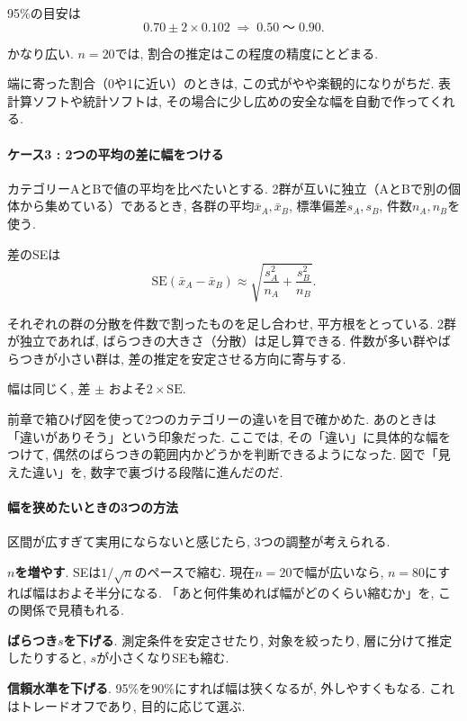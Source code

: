     95\%の目安は
    \[
      0.70 \pm 2 \times 0.102 \;\Rightarrow\; 0.50\;\text{〜}\;0.90.
    \]

    かなり広い.
    $n=20$では, 割合の推定はこの程度の精度にとどまる.

    端に寄った割合（0や1に近い）のときは, この式がやや楽観的になりがちだ.
    表計算ソフトや統計ソフトは, その場合に少し広めの安全な幅を自動で作ってくれる.

    \paragraph{ケース3 : 2つの平均の差に幅をつける}

    カテゴリーAとBで値の平均を比べたいとする.
    2群が互いに独立（AとBで別の個体から集めている）であるとき,
    各群の平均$\bar{x}_A, \bar{x}_B$, 標準偏差$s_A, s_B$, 件数$n_A, n_B$を使う.

    差のSEは
    \[
      \mathrm{SE}(\bar{x}_A - \bar{x}_B) \approx \sqrt{\frac{s_A^2}{n_A} + \frac{s_B^2}{n_B}}.
    \]

    それぞれの群の分散を件数で割ったものを足し合わせ, 平方根をとっている.
    2群が独立であれば, ばらつきの大きさ（分散）は足し算できる.
    件数が多い群やばらつきが小さい群は, 差の推定を安定させる方向に寄与する.

    幅は同じく, 差 $\pm$ およそ$2 \times \mathrm{SE}$.

    前章で箱ひげ図を使って2つのカテゴリーの違いを目で確かめた.
    あのときは「違いがありそう」という印象だった.
    ここでは, その「違い」に具体的な幅をつけて,
    偶然のばらつきの範囲内かどうかを判断できるようになった.
    図で「見えた違い」を, 数字で裏づける段階に進んだのだ.

    \paragraph{幅を狭めたいときの3つの方法}

    区間が広すぎて実用にならないと感じたら, 3つの調整が考えられる.

    $n$\textbf{を増やす}.
    SEは$1/\sqrt{n}$のペースで縮む.
    現在$n=20$で幅が広いなら, $n=80$にすれば幅はおよそ半分になる.
    「あと何件集めれば幅がどのくらい縮むか」を, この関係で見積もれる.

    \textbf{ばらつき}$s$\textbf{を下げる}.
    測定条件を安定させたり, 対象を絞ったり, 層に分けて推定したりすると,
    $s$が小さくなりSEも縮む.

    \textbf{信頼水準を下げる}.
    95\%を90\%にすれば幅は狭くなるが, 外しやすくもなる.
    これはトレードオフであり, 目的に応じて選ぶ.

